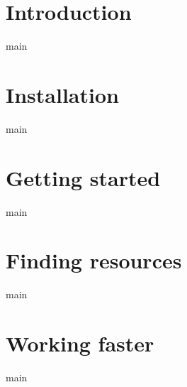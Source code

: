 \documentclass[oneside]{report}
\begin{document}
	\tableofcontents

	\chapter{Introduction}
		{main}

	\chapter{Installation}
		{main}

	\chapter{Getting started}
		{main}

	\chapter{Finding resources}
		{main}

	\chapter{Working faster}
		{main}
\end{document}
